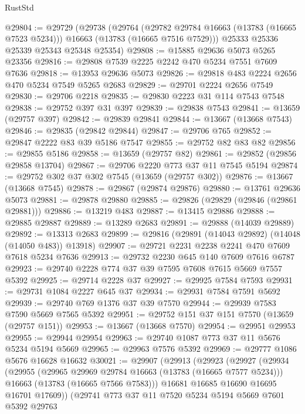 \begin{lexlean}{RustStd}
\begin{coremodule}
@29804 := @29729
    (@29738
      (@29764
        (@29782 @29784 @16663 (@13783 (@16665 @7523 @5234)))
        @16663
        (@13783 (@16665 @7516 @7529)))
      @25333
      @25336
      @25339
      @25343
      @25348
      @25354)
@29808 := @15885 @29636 @5073 @5265 @23356
@29816 := @29808 @7539 @2225 @2242 @470 @5234 @7551 @7609 @7636
@29818 := @13953 @29636 @5073
@29826 := @29818 @483 @2224 @2656 @470 @5234 @7549 @5265 @2683
@29829 := @29701 @2224 @2656 @7549
@29830 := @29706 @2218
@29835 := @29830 @2223 @31 @114 @7543 @7548
@29838 := @29752 @397 @31 @397
@29839 := @29838 @7543
@29841 := @13659 (@29757 @397)
@29842 := @29839 @29841
@29844 := @13667 (@13668 @7543)
@29846 := @29835 (@29842 @29844)
@29847 := @29706 @765
@29852 := @29847 @2222 @83 @39 @5186 @7547
@29855 := @29752 @82 @83 @82
@29856 := @29855 @5186
@29858 := @13659 (@29757 @82)
@29861 := @29852 (@29856 @29858 @13704)
@29867 := @29706 @2220 @773 @37 @11 @7545 @5194
@29874 := @29752 @302 @37 @302 @7545 (@13659 (@29757 @302))
@29876 := @13667 (@13668 @7545)
@29878 := @29867 (@29874 @29876)
@29880 := @13761 @29636 @5073
@29881 := @29878 @29880
@29885 := @29826 (@29829 (@29846 (@29861 @29881)))
@29886 := @13219 @483
@29887 := @13415 @29886
@29888 := @29885 @29887
@29889 := @13289 @2683
@29891 := @29888 (@14039 @29889)
@29892 := @13313 @2683
@29899 := @29816 (@29891 (@14043 @29892) (@14048 (@14050 @483)) @13918)
@29907 := @29721 @2231 @2238 @2241 @470 @7609 @7618 @5234 @7636
@29913 := @29732 @2230 @645 @140 @7609 @7616 @6787
@29923 := @29740 @2228 @774 @37 @39 @7595 @7608 @7615 @5669 @7557 @5392
@29925 := @29714 @2228 @37
@29927 := @29925 @7584 @7593
@29931 := @29731 @1084 @2227 @645 @37
@29934 := @29931 @7584 @7591 @5692
@29939 := @29740 @769 @1376 @37 @39 @7570
@29944 := @29939 @7583 @7590 @5669 @7565 @5392
@29951 := @29752 @151 @37 @151 @7570 (@13659 (@29757 @151))
@29953 := @13667 (@13668 @7570)
@29954 := @29951 @29953
@29955 := @29944 @29954
@29963 := @29740 @1087 @773 @37 @11 @5676 @5234 @5194 @5669
@29965 := @29963 @7576 @5392
@29969 := @29777 @1086 @5676 @16628 @16632
@30021 := @29907
    (@29913
      (@29923
        (@29927
          (@29934
            (@29955
              (@29965 @29969 @29784 @16663 (@13783 (@16665 @7577 @5234)))
              @16663
              (@13783 (@16665 @7566 @7583)))
            @16681
            @16685
            @16690
            @16695
            @16701
            @17609))
        (@29741
          @773
          @37
          @11
          @7520
          @5234
          @5194
          @5669
          @7601
          @5392
          @29763

\end{coremodule}
\end{lexlean}
